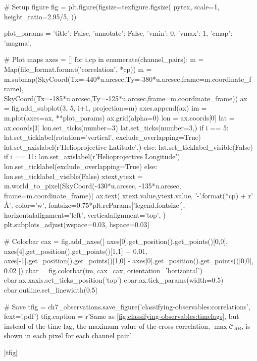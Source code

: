 \begin{pycode}
# Setup figure
fig = plt.figure(figsize=texfigure.figsize(
    pytex,
    scale=1,
    height_ratio=2.95/5,
))

plot_params = {
    'title': False, 
    'annotate': False,
    'vmin': 0,
    'vmax': 1,
    'cmap': 'magma',
}

# Plot maps
axes = []
for i,cp in enumerate(channel_pairs):
    m = Map(file_format.format('correlation', *cp))
    m = m.submap(SkyCoord(Tx=-440*u.arcsec,Ty=-380*u.arcsec,frame=m.coordinate_frame),
                 SkyCoord(Tx=-185*u.arcsec,Ty=-125*u.arcsec,frame=m.coordinate_frame))
    ax = fig.add_subplot(3, 5, i+1, projection=m)
    axes.append(ax)
    im = m.plot(axes=ax, **plot_params)
    ax.grid(alpha=0)
    lon = ax.coords[0]
    lat = ax.coords[1]
    lon.set_ticks(number=3)
    lat.set_ticks(number=3,) 
    if i == 5:
        lat.set_ticklabel(rotation='vertical', exclude_overlapping=True)
        lat.set_axislabel(r'Helioprojective Latitude',)
    else:
        lat.set_ticklabel_visible(False)
    if i == 11:
        lon.set_axislabel(r'Helioprojective Longitude')
        lon.set_ticklabel(exclude_overlapping=True)
    else:
        lon.set_ticklabel_visible(False)
    xtext,ytext = m.world_to_pixel(SkyCoord(-430*u.arcsec, -135*u.arcsec, frame=m.coordinate_frame))
    ax.text(
        xtext.value,ytext.value,
        '{}-{}'.format(*cp) + r' \si{\angstrom}',
        color='w',
        fontsize=0.75*plt.rcParams['legend.fontsize'],
        horizontalalignment='left',
        verticalalignment='top',
    )
plt.subplots_adjust(wspace=0.03, hspace=0.03)

# Colorbar
cax = fig.add_axes([
    axes[0].get_position().get_points()[0,0],
    axes[4].get_position().get_points()[1,1] + 0.01,
    axes[-1].get_position().get_points()[1,0] - axes[0].get_position().get_points()[0,0], 
    0.02
])
cbar = fig.colorbar(im, cax=cax, orientation='horizontal')
cbar.ax.xaxis.set_ticks_position('top')
cbar.ax.tick_params(width=0.5)
cbar.outline.set_linewidth(0.5)

# Save
tfig = ch7_observations.save_figure('classifying-observables:correlations', fext='.pdf')
tfig.caption = r'Same as \autoref{fig:classifying-observables:timelags}, but instead of the time lag, the maximum value of the cross-correlation, $\max\mathcal{C}_{AB}$, is shown in each pixel for each channel pair.'
\end{pycode}
|tfig|

